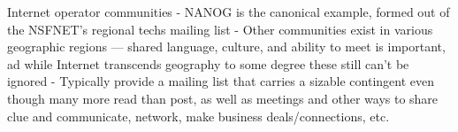 Internet operator communities
       - NANOG is the canonical example, formed out of the NSFNET's
         regional techs mailing list
       - Other communities exist in various geographic regions —
         shared language, culture, and ability to meet is important,
         ad while Internet transcends geography to some degree these
         still can't be ignored
       - Typically provide a mailing list that carries a sizable
         contingent even though many more read than post, as well as
         meetings and other ways to share clue and communicate,
         network, make business deals/connections, etc.
